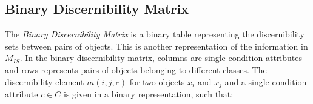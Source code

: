 \documentclass[authoryear,preprint,review,12pt]{elsarticle}
\begin{document}
%
%
%  
%  
\subsection{Binary Discernibility Matrix}
  The \textit{Binary Discernibility Matrix} is a binary table representing the discernibility sets between pairs 
  of objects. This is another representation of the information in $M_{IS}$. In the binary discernibility
  matrix, columns are single condition attributes and rows represents pairs of objects belonging to different 
  classes. The discernibility element $m(i, j, c)$ for two objects $x_i$ and $x_j$ and a single condition 
  attribute $c \in C$ is given in a binary representation, such that:
  
\end{document}
